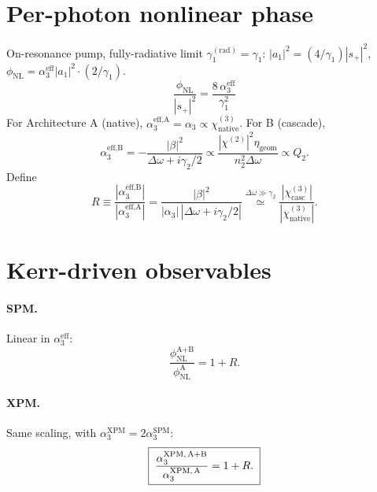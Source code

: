\documentclass[11pt,a4paper]{article}
\newcommand{\chitwo}{\chi^{(2)}}
\newcommand{\chithree}{\chi^{(3)}}
\newcommand{\Dom}{\Delta\omega}
\begin{document}
\section{Per-photon nonlinear phase}\label{sec:phi}

On-resonance pump, fully-radiative limit $\gamma_1^{(\text{rad})}=\gamma_1$: $|a_1|^2=(4/\gamma_1)|s_+|^2$, $\phi_\text{NL}=\alpha_3^\text{eff}|a_1|^2\cdot(2/\gamma_1)$.
\begin{equation}
  \boxed{\;\frac{\phi_\text{NL}}{|s_+|^{2}}=\frac{8\,\alpha_3^\text{eff}}{\gamma_1^{2}}\;}
  \label{eq:phi-per-photon}
\end{equation}
For Architecture A (native), $\alpha_3^\text{eff,A}=\alpha_3\propto\chithree_\text{native}$. For B (cascade),
\begin{equation}
  \alpha_3^\text{eff,B}=-\frac{|\beta|^{2}}{\Dom+i\gamma_2/2}\propto\frac{|\chitwo|^{2}\eta_\text{geom}}{n_2^{2}\Dom}\propto Q_2.
\end{equation}
Define
\begin{equation}
  \boxed{\;R\equiv\frac{|\alpha_3^\text{eff,B}|}{|\alpha_3^\text{eff,A}|}
        =\frac{|\beta|^{2}}{|\alpha_3|\,|\Dom+i\gamma_2/2|}
        \stackrel{\Dom\gg\gamma_2}{\simeq}\frac{|\chithree_\text{casc}|}{|\chithree_\text{native}|}.\;}
  \label{eq:R-def}
\end{equation}

\section{Kerr-driven observables}\label{sec:obs}

\paragraph{SPM.} Linear in $\alpha_3^\text{eff}$:
\begin{equation}
  \boxed{\;\frac{\phi_\text{NL}^{\text{A+B}}}{\phi_\text{NL}^{\text{A}}}=1+R.\;}
\end{equation}

\paragraph{XPM.} Same scaling, with $\alpha_3^\text{XPM}=2\alpha_3^\text{SPM}$:
\begin{equation}
  \boxed{\;\frac{\alpha_3^\text{XPM,\,A+B}}{\alpha_3^\text{XPM,\,A}}=1+R.\;}
\end{equation}
\end{document}
